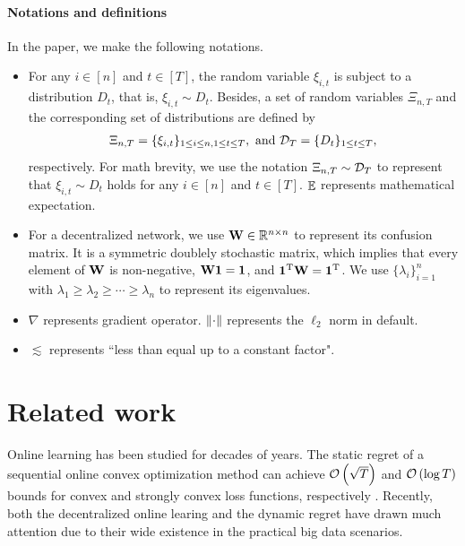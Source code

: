 \documentclass{article}
\begin{document}
\paragraph{Notations and definitions}
In the paper, we make the following notations.
\begin{itemize}
\item For any $i\in[n]$ and $t\in[T]$, the random variable $\xi_{i,t}$ is subject to a distribution $D_t$, that is, $\xi_{i,t} \sim D_t$. Besides, a set of random variables $\Xi_{n,T}$ and the corresponding set of distributions are defined by
\begin{align}
\nonumber
\Xi_{n,T} = \{ \xi_{i,t} \}_{1\le i \le n, 1 \le t \le T}, \text{~and~} \mathcal{D}_{T} = \{ D_t \}_{1 \le t \le T},
\end{align} respectively. For math brevity, we use the notation $\Xi_{n,T} \sim \mathcal{D}_{T}$ to represent that $\xi_{i,t} \sim D_t$ holds for any $i\in[n]$ and $t\in[T]$. $\mathop{\mathbb{E}}$ represents mathematical expectation.
\item For a decentralized network, we use ${\bf W} \in\mathbb{R}^{n\times n}$ to represent its confusion matrix. It is a symmetric doublely stochastic matrix, which implies that every element of ${\bf W}$ is non-negative, ${\bf W} {\bf 1} = {\bf 1}$, and ${\bf 1}^{\rm T}{\bf W}  = {\bf 1}^{\rm T}$. We use $\{\lambda_i\}_{i=1}^n$ with $\lambda_1 \ge \lambda_2 \ge \cdots \ge \lambda_n$ to represent its eigenvalues. 
\item $\nabla$ represents gradient operator. $\left\lVert\cdot\right\rVert$ represents the $\ell_2$ norm in default.
\item $\lesssim$ represents ``less than equal up to a constant factor".
\end{itemize} 
    











\section{Related work}
\label{sect_related_work}
Online learning has been studied for decades of years. The static regret of a sequential online convex optimization method can achieve ${\mathcal{O}\left( \sqrt{T} \right)}$ and ${\mathcal{O}\left( \log T \right)}$ bounds for convex and strongly convex loss functions, respectively \citep{Hazan2016Introduction,ShalevShwartz:2012dz}. Recently, both the decentralized online learing and the dynamic regret have drawn much attention due to their wide existence in the practical big data scenarios.
\end{document}
